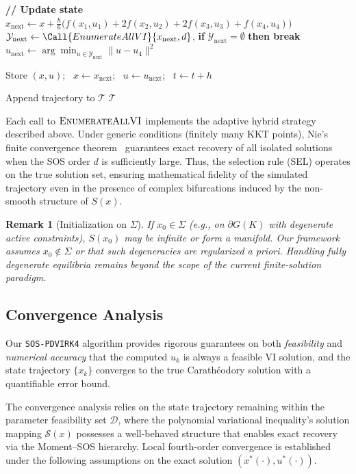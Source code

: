 \documentclass[sn-basic,Numbered]{sn-jnl}
\theoremstyle{thmstyleone}%
\newtheorem{remark}{Remark}%
\begin{document}
\begin{algorithm}[htbp]
\begin{algorithmic}[1]
        \Statex \textbf{// Update state}
        \State $x_{\text{next}} \gets x + \tfrac{h}{6} \big( f(x_1,u_1) + 2f(x_2,u_2) + 2f(x_3,u_3) + f(x_4,u_4) \big)$
        \State $\mathcal{Y}_{\text{next}} \gets \Call{EnumerateAllVI}{x_{\text{next}}, d}$, \quad \textbf{if} $\mathcal{Y}_{\text{next}} = \emptyset$ \textbf{then break}
        \State $u_{\text{next}} \gets \arg\min_{u \in \mathcal{Y}_{\text{next}}} \| u - u_4 \|^2$
        
        \State Store $(x, u)$; \ $x \gets x_{\text{next}}$; \ $u \gets u_{\text{next}}$; \ $t \gets t + h$
    \EndWhile
    
     Append trajectory to $\mathcal{T}$ \EndIf
\EndFor
\State \Return $\mathcal{T}$
\end{algorithmic}
\end{algorithm}

Each call to $\textsc{EnumerateAllVI}$ implements the adaptive hybrid strategy described above. Under generic conditions (finitely many KKT points), Nie’s finite convergence theorem~\cite[Thm.~3.3]{nie2013finite} guarantees exact recovery of all isolated solutions when the SOS order $d$ is sufficiently large. Thus, the selection rule (SEL) operates on the true solution set, ensuring mathematical fidelity of the simulated trajectory even in the presence of complex bifurcations induced by the non-smooth structure of $S(x)$.

\begin{remark}[Initialization on $\Sigma$]
If $x_0 \in \Sigma$ (e.g., on $\partial G(K)$ with degenerate active constraints), $S(x_0)$ may be infinite or form a manifold. Our framework assumes $x_0 \notin \Sigma$ or that such degeneracies are regularized a priori. Handling fully degenerate equilibria remains beyond the scope of the current finite-solution paradigm.
\end{remark}

\subsection{Convergence Analysis}
\label{subsec:convergence}

Our \texttt{SOS-PDVIRK4} algorithm provides rigorous guarantees on both \emph{feasibility} and \emph{numerical accuracy} that the computed $u_k$ is always a feasible VI solution, and the state trajectory $\{x_k\}$ converges to the true Carath\'{e}odory solution with a quantifiable error bound.

The convergence analysis relies on the state trajectory remaining within the parameter feasibility set $\mathcal{D}$, where the polynomial variational inequality's solution mapping $\mathcal{S}(x)$ possesses a well-behaved structure that enables exact recovery via the Moment--SOS hierarchy. Local fourth-order convergence is established under the following assumptions on the exact solution $(x^*(\cdot), u^*(\cdot))$.
\end{document}
